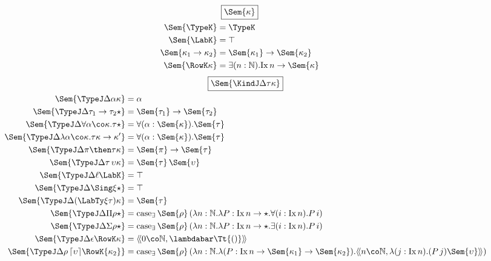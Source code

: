 \documentclass[authoryear,acmsmall,screen]{acmart}
\newcommand\Absurd{\ensuremath{\lambdabar\mathrm{\Tt{()}}}}
\newcommand\Nat{\mathbb{N}}
\newcommand\Ix[1]{\mathrm{Ix} \, #1}
\newcommand\Ixed[1]{\ensuremath{\Sem{#1}}}
\newcommand\TyPair[3]{\ensuremath{\langle\!\langle #1 \co #2 , #3 \rangle\!\rangle}}
\newcommand\Lift[1]{\ensuremath{\lceil #1 \rceil}}
\renewcommand\Case{\mathrm{case}}
\newcommand\CaseP[2]{\ensuremath{\Case_{\mathrm{\exists}} \, #1 \, #2 }}
\begin{document}
\begin{figure}[H]
\begin{gather*}
\fbox{$\Ixed{\kappa}$} \\
\begin{align*}
\vspace{5em}
\Ixed{\TypeK} &= \TypeK \\
\Ixed{\LabK} &= \top \\
\Ixed{\kappa_1 \to \kappa_2} &= \Ixed{\kappa_1} \to \Ixed{\kappa_2} \\
\Ixed{\RowK \kappa} &= \exists(n : \Nat). \Ix  n \to \Ixed{\kappa} \\
\end{align*}
\end{gather*}
\begin{gather*}
\fbox{$\Ixed{\KindJ \Delta \tau \kappa}$} \\
\begin{align*}
\vspace{5em}
\Ixed{\TypeJ \Delta \alpha \kappa} &= \alpha \\
\Ixed{\TypeJ \Delta {\tau_1 \to \tau_2} \star} &= \Ixed{\tau_1} \to \Ixed{\tau_2} \\
\Ixed{\TypeJ \Delta {\forall \alpha \co \kappa. \tau} \star} &= \forall (\alpha : \Ixed{\kappa}).\Ixed{\tau} \\
\Ixed{\TypeJ \Delta {\lambda \alpha \co \kappa. \tau} {\kappa \to \kappa'}} &= \forall (\alpha : \Ixed{\kappa}).\Ixed{\tau} \\
\Ixed{\TypeJ \Delta {\pi \then \tau} \kappa} &= \Ixed{\pi} \to \Ixed{\tau} \\
\Ixed{\TypeJ \Delta {\tau \, \upsilon} \kappa} &= \Ixed{\tau} \, \Ixed{\upsilon} \\
\Ixed{\TypeJ \Delta \ell {\LabK}} &= \top  \\
\Ixed{\TypeJ \Delta {\Sing \xi} \star} &= \top  \\
\Ixed{\TypeJ \Delta {(\LabTy \xi \tau)} \kappa}&= \Ixed{\tau}  \\
\Ixed{\TypeJ \Delta {\Pi \rho} \star}&= \CaseP {\Ixed{\rho}} {(\lambda n : \Nat. \lambda P : \Ix{n} \to \star. \forall (i : \Ix{n}). P \, i)}\\
\Ixed{\TypeJ \Delta {\Sigma \rho} \star}&= \CaseP {\Ixed{\rho}} {(\lambda n : \Nat. \lambda P : \Ix{n} \to \star. \exists (i : {\Ix n}). P \, i)}\\
\Ixed{\TypeJ \Delta \epsilon {\RowK \kappa}} &= \TyPair 0 \Nat \Absurd \\
\Ixed{\TypeJ \Delta {\rho \, \Lift{\upsilon}} {\RowK {\kappa_{2}}}} &= \CaseP {\Ixed \rho} {(\lambda n : \Nat. \lambda (P : \Ix n \to \Sem{\kappa_{1}} \to \Sem{\kappa_{2}}).  \TyPair {n} {\Nat} {\lambda (j : \Ix n). (P \, j) \Sem{\upsilon} })} \\

\end{align*}
\end{gather*}
\end{figure}
\end{document}
